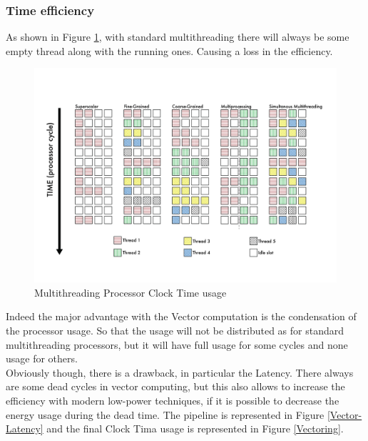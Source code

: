 \subsubsection{Time efficiency}
As shown in Figure \ref{Multithreading}, with standard multithreading there will always be some empty thread along with the running ones. Causing a loss in the efficiency.
\begin{figure}[H]
    \centering
    \includegraphics[scale = 0.5]{Chapter_1/img/threads.png}
    \caption{Multithreading Processor Clock Time usage  \cite{L15-Krste}}
    \label{Multithreading}
\end{figure}

Indeed the major advantage with the Vector computation is the condensation of the processor usage. 
So that the usage will not be distributed as for standard multithreading processors, but it will have full usage for some cycles and none usage for others\cite{L15-Krste}.\\

Obviously though, there is a drawback, in particular the Latency. There always are some dead cycles in vector computing, but this also allows to increase the efficiency with modern low-power techniques, if it is possible to decrease the energy usage during the dead time.
The pipeline is represented in Figure \ref{Vector-Latency} and the final Clock Tima usage is represented in Figure \ref{Vectoring}.

